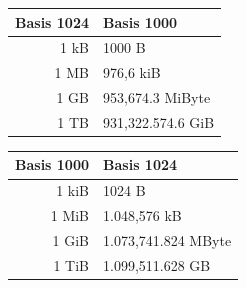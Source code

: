 \documentclass[10pt,a4paper,notitlepage]{scrartcl}
\begin{document}
\vspace{2mm}
\begin{center}
\begin{tabularx}{8cm}{r|l}
\textbf{Basis 1024}&\textbf{Basis 1000}\\
\hline
1 kB&1000 B\\
1 MB&976,6 kiB\\
1 GB&953,674.3 MiByte\\
1 TB&931,322.574.6 GiB
\end{tabularx}
\hspace{5mm}
\begin{tabularx}{8cm}{r|l}
\textbf{Basis 1000}&\textbf{Basis 1024}\\
\hline
1 kiB&1024 B\\
1 MiB&1.048,576 kB\\
1 GiB&1.073,741.824 MByte\\
1 TiB&1.099,511.628 GB
\end{tabularx}
\end{center}
\newpage
\end{document}
